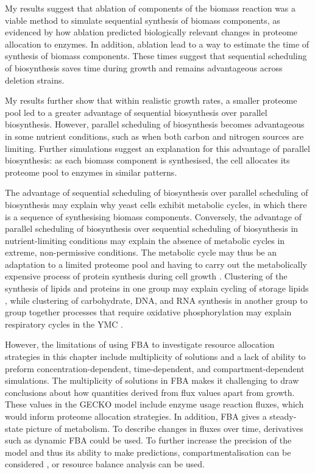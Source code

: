 My results suggest that ablation of components of the biomass reaction was a viable method to simulate sequential synthesis of biomass components, as evidenced by how ablation predicted biologically relevant changes in proteome allocation to enzymes.
In addition, ablation lead to a way to estimate the time of synthesis of biomass components.
These times suggest that sequential scheduling of biosynthesis saves time during growth and remains advantageous across deletion strains.

My results further show that within realistic growth rates, a smaller proteome pool led to a greater advantage of sequential biosynthesis over parallel biosynthesis.
However, parallel scheduling of biosynthesis becomes advantageous in some nutrient conditions, such as when both carbon and nitrogen sources are limiting.
Further simulations suggest an explanation for this advantage of parallel biosynthesis: as each biomass component is synthesised, the cell allocates its proteome pool to enzymes in similar patterns.

The advantage of sequential scheduling of biosynthesis over parallel scheduling of biosynthesis may explain why yeast cells exhibit metabolic cycles, in which there is a sequence of synthesising biomass components.
Conversely, the advantage of parallel scheduling of biosynthesis over sequential scheduling of biosynthesis in nutrient-limiting conditions may explain the absence of metabolic cycles in extreme, non-permissive conditions.
The metabolic cycle may thus be an adaptation to a limited proteome pool and having to carry out the metabolically expensive process of protein synthesis during cell growth \parencite{oneillEukaryoticCellBiology2020}.
Clustering of the synthesis of lipids and proteins in one group may explain cycling of storage lipids \parencite{campbellBuildingBlocksAre2020}, while clustering of carbohydrate, DNA, and RNA synthesis in another group to group together processes that require oxidative phosphorylation may explain respiratory cycles in the YMC \parencite{tuLogicYeastMetabolic2005}.

However, the limitations of using FBA to investigate resource allocation strategies in this chapter include multiplicity of solutions and a lack of ability to preform concentration-dependent, time-dependent, and compartment-dependent simulations.
The multiplicity of solutions in FBA makes it challenging to draw conclusions about how quantities derived from flux values apart from growth.
These values in the GECKO model include enzyme usage reaction fluxes, which would inform proteome allocation strategies.
In addition, FBA gives a steady-state picture of metabolism.
To describe changes in fluxes over time, derivatives such as dynamic FBA \parencite{mahadevanDynamicFluxBalance2002} could be used.
To further increase the precision of the model and thus its ability to make predictions, compartmentalisation can be considered \parencite{elsemmanWholecellModelingYeast2022}, or resource balance analysis \parencite{goelzerCellDesignBacteria2011} can be used.
